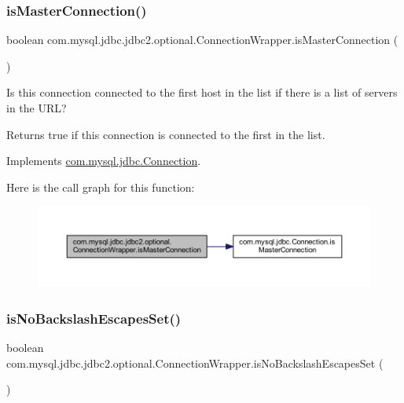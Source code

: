 \subsubsection{\texorpdfstring{is\+Master\+Connection()}{isMasterConnection()}}
{\footnotesize\ttfamily boolean com.\+mysql.\+jdbc.\+jdbc2.\+optional.\+Connection\+Wrapper.\+is\+Master\+Connection (\begin{DoxyParamCaption}{ }\end{DoxyParamCaption})}

Is this connection connected to the first host in the list if there is a list of servers in the U\+RL?

\begin{DoxyReturn}{Returns}
true if this connection is connected to the first in the list. 
\end{DoxyReturn}


Implements \mbox{\hyperlink{interfacecom_1_1mysql_1_1jdbc_1_1_connection_a39d6c162da8f21b7c2a3299f91e7c65a}{com.\+mysql.\+jdbc.\+Connection}}.

Here is the call graph for this function\+:
\nopagebreak
\begin{figure}[H]
\begin{center}
\leavevmode
\includegraphics[width=350pt]{classcom_1_1mysql_1_1jdbc_1_1jdbc2_1_1optional_1_1_connection_wrapper_a4259500598efa1b3dc8cf4317792338b_cgraph}
\end{center}
\end{figure}
\mbox{\label{classcom_1_1mysql_1_1jdbc_1_1jdbc2_1_1optional_1_1_connection_wrapper_a75f9e3be6db60cb253060986aac46e4c}} 
\subsubsection{\texorpdfstring{is\+No\+Backslash\+Escapes\+Set()}{isNoBackslashEscapesSet()}}
{\footnotesize\ttfamily boolean com.\+mysql.\+jdbc.\+jdbc2.\+optional.\+Connection\+Wrapper.\+is\+No\+Backslash\+Escapes\+Set (\begin{DoxyParamCaption}{ }\end{DoxyParamCaption})}

